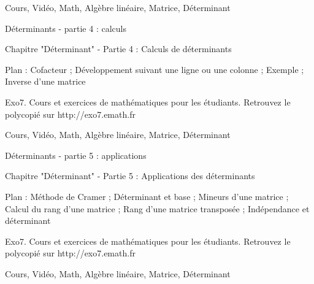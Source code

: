 
Cours, Vidéo, Math, Algèbre linéaire, Matrice, Déterminant




Déterminants - partie 4 : calculs



Chapitre "Déterminant" - Partie 4 : Calculs de déterminants

Plan : Cofacteur ; Développement suivant une ligne ou une colonne ; 
Exemple ; Inverse d'une matrice

Exo7. Cours et exercices de mathématiques pour les étudiants.
Retrouvez le polycopié sur http://exo7.emath.fr


Cours, Vidéo, Math, Algèbre linéaire, Matrice, Déterminant




Déterminants - partie 5 : applications



Chapitre "Déterminant" - Partie 5 : Applications des déterminants

Plan : Méthode de Cramer ; Déterminant et base ; Mineurs d'une matrice ; 
Calcul du rang d'une matrice ; Rang d'une matrice transposée ; Indépendance et déterminant

Exo7. Cours et exercices de mathématiques pour les étudiants.
Retrouvez le polycopié sur http://exo7.emath.fr


Cours, Vidéo, Math, Algèbre linéaire, Matrice, Déterminant

